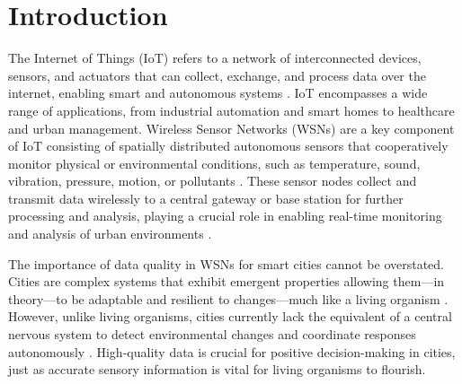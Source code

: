 \section{Introduction}




The Internet of Things (IoT) refers to a network of interconnected devices, sensors, and actuators that can collect, exchange, and process data over the internet, enabling smart and autonomous systems \citep{atzoriInternetThingsSurvey2010}. IoT encompasses a wide range of applications, from industrial automation and smart homes to healthcare and urban management. Wireless Sensor Networks (WSNs) are a key component of IoT consisting of spatially distributed autonomous sensors that cooperatively monitor physical or environmental conditions, such as temperature, sound, vibration, pressure, motion, or pollutants \citep{akyildizWirelessSensorNetworks2002}. These sensor nodes collect and transmit data wirelessly to a central gateway or base station for further processing and analysis, playing a crucial role in enabling real-time monitoring and analysis of urban environments \citep{gubbiInternetThingsIoT2013}.

The importance of data quality in WSNs for smart cities cannot be overstated. Cities are complex systems that exhibit emergent properties \citep{bocchiLivingEdgeChaos2016} allowing them---in theory---to be adaptable and resilient to changes—much like a living organism \citep{langtonComputationEdgeChaos1990}. However, unlike living organisms, cities currently lack the equivalent of a central nervous system to detect environmental changes and coordinate responses autonomously \citep{tortoraPrinciplesAnatomyPhysiology2018}. High-quality data is crucial for positive decision-making in cities, just as accurate sensory information is vital for living organisms to flourish.

